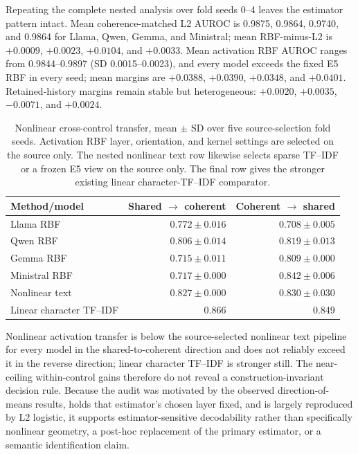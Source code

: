 \documentclass{article}
\begin{document}
Repeating the complete nested analysis over fold seeds 0--4 leaves the
estimator pattern intact. Mean coherence-matched L2 AUROC is 0.9875, 0.9864,
0.9740, and 0.9864 for Llama, Qwen, Gemma, and Ministral; mean RBF-minus-L2 is
$+0.0009$, $+0.0023$, $+0.0104$, and $+0.0033$. Mean activation RBF AUROC
ranges from 0.9844--0.9897 (SD 0.0015--0.0023), and every model exceeds the
fixed E5 RBF in every seed; mean margins are $+0.0388$, $+0.0390$, $+0.0348$,
and $+0.0401$. Retained-history margins remain stable but
heterogeneous: $+0.0020$, $+0.0035$, $-0.0071$, and $+0.0024$.

\begin{table}[h]
  \caption{Nonlinear cross-control transfer, mean $\mathbin{\pm}$ SD over five
  source-selection fold seeds. Activation RBF layer, orientation, and kernel
  settings are selected on the source only. The nested nonlinear text row
  likewise selects sparse TF--IDF or a frozen E5 view on the source only. The
  final row gives the stronger existing linear character-TF--IDF comparator.}
  \label{tab:appendix-nonlinear-transfer}
  \centering
  \small
  \begin{tabular}{lrr}
    \toprule
    Method/model & Shared $\rightarrow$ coherent & Coherent $\rightarrow$ shared \\
    \midrule
    Llama RBF & $0.772\mathbin{\pm}0.016$ & $0.708\mathbin{\pm}0.005$ \\
    Qwen RBF & $0.806\mathbin{\pm}0.014$ & $0.819\mathbin{\pm}0.013$ \\
    Gemma RBF & $0.715\mathbin{\pm}0.011$ & $0.809\mathbin{\pm}0.000$ \\
    Ministral RBF & $0.717\mathbin{\pm}0.000$ & $0.842\mathbin{\pm}0.006$ \\
    Nonlinear text & $0.827\mathbin{\pm}0.000$ & $0.830\mathbin{\pm}0.030$ \\
    Linear character TF--IDF & 0.866 & 0.849 \\
    \bottomrule
  \end{tabular}
\end{table}

Nonlinear activation transfer is below the source-selected nonlinear text
pipeline for every model in the shared-to-coherent direction and does not
reliably exceed it in the reverse direction; linear character TF--IDF is
stronger still. The near-ceiling within-control gains therefore do not reveal a
construction-invariant decision rule. Because the audit was motivated by the
observed direction-of-means results, holds that estimator's chosen layer fixed,
and is largely reproduced by L2 logistic, it supports estimator-sensitive
decodability rather than specifically nonlinear geometry, a post-hoc
replacement of the primary estimator, or a semantic identification claim.
\end{document}
